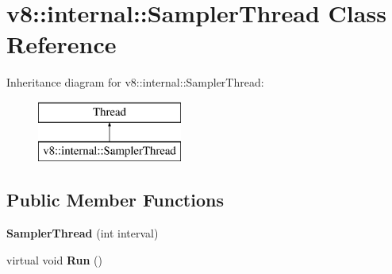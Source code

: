 \hypertarget{classv8_1_1internal_1_1_sampler_thread}{}\section{v8\+:\+:internal\+:\+:Sampler\+Thread Class Reference}
\label{classv8_1_1internal_1_1_sampler_thread}
Inheritance diagram for v8\+:\+:internal\+:\+:Sampler\+Thread\+:\begin{figure}[H]
\begin{center}
\leavevmode
\includegraphics[height=2.000000cm]{classv8_1_1internal_1_1_sampler_thread}
\end{center}
\end{figure}
\subsection*{Public Member Functions}
\begin{DoxyCompactItemize}
\item 
\hypertarget{classv8_1_1internal_1_1_sampler_thread_a3e212b66342406f674dd476df2155c50}{}{\bfseries Sampler\+Thread} (int interval)\label{classv8_1_1internal_1_1_sampler_thread_a3e212b66342406f674dd476df2155c50}

\item 
\hypertarget{classv8_1_1internal_1_1_sampler_thread_ac1d42ef1e1f8ed4be68b4ab08b8236e9}{}virtual void {\bfseries Run} ()\label{classv8_1_1internal_1_1_sampler_thread_ac1d42ef1e1f8ed4be68b4ab08b8236e9}

\end{DoxyCompactItemize}
